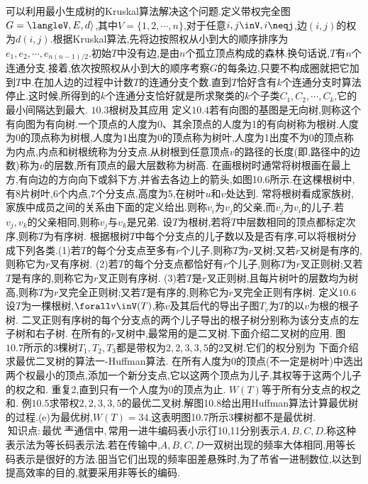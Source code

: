 可以利用最小生成树的Kruskal算法解决这个问题.定义带权完全图$G=\langleV,E,d\rangle$,其中$V=$$\{1,2,\cdots,n\}$,对于任意$i,j\inV,i\neqj$,边$(i,j)$的权为$d(i,j)$.根据Kruskal算法,先将边按照权从小到大的顺序排序为$e_{1},e_{2},\cdots,e_{n(n-1)/2}$.初始$T$中没有边,是由$n$个孤立顶点构成的森林.换句话说,$T$有$n$个连通分支.接着,依次按照权从小到大的顺序考察$G$的每条边,只要不构成圈就把它加到$T$中.在加人边的过程中计数$T$的连通分支个数.直到$T$恰好含有$k$个连通分支时算法停止.这时候,所得到的$k$个连通分支恰好就是所求聚类的$k$个子类$C_{1},C_{2},\cdots,C_{k}$,它的最小间隔达到最大.
{$10.3$根树及其应用}
定义$10.4$若有向图的基图是无向树,则称这个有向图为有向树.一个顶点的人度为0、其余顶点的人度为1的有向树称为根树.人度为0的顶点称为树根,人度为1出度为0的顶点称为树叶,人度为1出度不为0的顶点称为内点,内点和树根统称为分支点.从树根到任意顶点$v$的路径的长度(即,路径中的边数)称为$v$的层数,所有顶点的最大层数称为树高.
在画根树时通常将树根画在最上方,有向边的方向向下或斜下方,并省去各边上的箭头,如图10.6所示.在这棵根树中,有8片树叶,6个内点,7个分支点,高度为5,在树叶$u$和$v$处达到.
常将根树看成家族树,家族中成员之间的关系由下面的定义给出.则称$v_{i}$为$v_{j}$的父亲,而$v_{j}$为$v_{i}$的儿子.若$v_{j},v_{k}$的父亲相同,则称$v_{j}$与$v_{k}$是兄弟.
设$T$为根树,若将$T$中层数相同的顶点都标定次序,则称$T$为有序树.
根据根树$T$中每个分支点的儿子数以及是否有序,可以将根树分成下列各类.(1)若$T$的每个分支点至多有$r$个儿子,则称$T$为$r$叉树;又若$r$又树是有序的,则称它为$r$叉有序树.
(2)若$T$的每个分支点都恰好有$r$个儿子,则称$T$为$r$叉正则树;又若$T$是有序的,则称它为$r$叉正则有序树.
(3)若$T$是$r$叉正则树,且每片树叶的层数均为树高,则称$T$为$r$叉完全正则树;又若$T$是有序的,则称它为$r$叉完全正则有序树.
定义$10.6$设$T$为一棵根树,$\forallv\inV(T)$,称$v$及其后代的导出子图$T_{v}$为$T$的以$v$为根的根子树.
二叉正则有序树的每个分支点的两个儿子导出的根子树分别称为该分支点的左子树和右子树.
在所有的$r$叉树中,最常用的是二叉树.下面介绍二叉树的应用.
图$10.7$所示的3棵树$T_{1},T_{2},T_{3}$都是带权为$2,2,3,3,5$的2叉树.它们的权分别为
下面介绍求最优二叉树的算法一-Huffman算法.
在所有人度为0的顶点(不一定是树叶)中选出两个权最小的顶点,添加一个新分支点,它以这两个顶点为儿子,其权等于这两个儿子的权之和.
重复2,直到只有一个人度为0的顶点为止.
$W(T)$等于所有分支点的权之和.
例$\mathbf{10.5}$求带权$2,2,3,3,5$的最优二叉树.解图10.8给出用Huffman算法计算最优树的过程.(e)为最优树,$W(T)=34$.这表明图10.7所示3棵树都不是最优树.
$\mathrm{~知识点:最优~龶通信中,常用一进牛编码表小示㣔}$10,11分别表示$A,B,C,D$.称这种表示法为等长码表示法.若在传输中,$A,B,C,D$一双树出现的频率大体相同,用等长码表示是很好的方法.昍当它们出现的频率昍差悬殊时,为了芇省一进制数位,以达到提高效率的目的,就要采用非等长的编码.
$$
